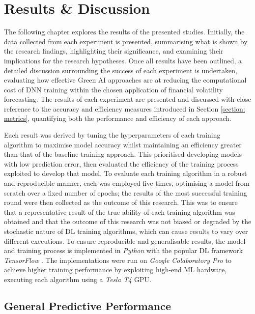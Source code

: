 \documentclass[a4paper, 11pt]{report}
\begin{document}
    \newpage
    \chapter{Results \& Discussion}
    \label{chapter: results-discussion}

    The following chapter explores the results of the presented studies. Initially, the data collected from each experiment is presented, summarising what is shown by the research findings, highlighting their significance, and examining their implications for the research hypotheses. Once all results have been outlined, a detailed discussion surrounding the success of each experiment is undertaken, evaluating how effective Green AI approaches are at reducing the computational cost of DNN training within the chosen application of financial volatility forecasting. The results of each experiment are presented and discussed with close reference to the accuracy and efficiency measures introduced in Section \ref{section: metrics}, quantifying both the performance and efficiency of each approach.
    
    Each result was derived by tuning the hyperparameters of each training algorithm to maximise model accuracy whilst maintaining an efficiency greater than that of the baseline training approach. This prioritised developing models with low prediction error, then evaluated the efficiency of the training process exploited to develop that model. To evaluate each training algorithm in a robust and reproducible manner, each was employed five times, optimising a model from scratch over a fixed number of epochs; the results of the most successful training round were then collected as the outcome of this research. This was to ensure that a representative result of the true ability of each training algorithm was obtained and that the outcome of this research was not biased or degraded by the stochastic nature of DL training algorithms, which can cause results to vary over different executions. To ensure reproducible and generalisable results, the model and training process is implemented in \emph{Python} with the popular DL framework \emph{TensorFlow} \citep{abadi-2016}. The implementations were run on \emph{Google Colaboratory Pro} to achieve higher training performance by exploiting high-end ML hardware, executing each algorithm using a \emph{Tesla T4} GPU. 

    \section{General Predictive Performance}
\end{document}
